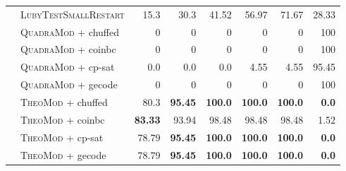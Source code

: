 \documentclass{book}
\begin{document}
\begin{table}[]
\begin{tabular}{@{}ll rr rr rr@{}}
& \textsc{LubyTestSmallRestart}   & 15.3 & 30.3 & 41.52 & 56.97 & 71.67 & 28.33 \\
& \textsc{QuadraMod} + chuffed   & 0 & 0 & 0 & 0 & 0 & 100 \\
& \textsc{QuadraMod} + coinbc   & 0 & 0 & 0 & 0 & 0 & 100 \\
& \textsc{QuadraMod} + cp-sat   & 0.0 & 0.0 & 0.0 & 4.55 & 4.55 & 95.45 \\
& \textsc{QuadraMod} + gecode   & 0 & 0 & 0 & 0 & 0 & 100 \\
& \textsc{TheoMod} + chuffed   & 80.3 & \bf 95.45 & \bf 100.0 & \bf 100.0 & \bf 100.0 &  \bf 0.0 \\
& \textsc{TheoMod} + coinbc   & \bf 83.33 & 93.94 & 98.48 & 98.48 & 98.48 & 1.52 \\
& \textsc{TheoMod} + cp-sat   & 78.79 & \bf 95.45 & \bf 100.0 & \bf 100.0 & \bf 100.0 &  \bf 0.0 \\
& \textsc{TheoMod} + gecode   & 78.79 & \bf 95.45 & \bf 100.0 & \bf 100.0 & \bf 100.0 &  \bf 0.0 \\
\bottomrule\end{tabular} 

\end{table} 




\vspace{2cm}
\end{document}
